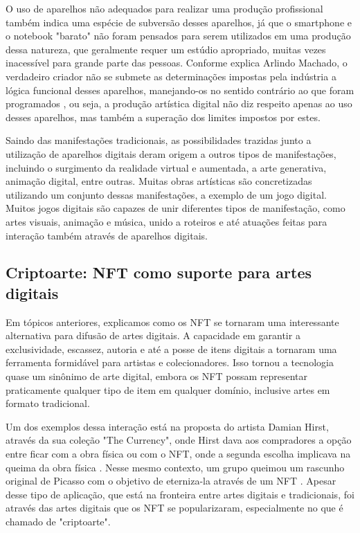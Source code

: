 O uso de aparelhos não adequados para realizar uma produção profissional também indica uma espécie de subversão desses aparelhos, já que o smartphone e o notebook "barato" não foram pensados para serem utilizados em uma produção dessa natureza, que geralmente requer um estúdio apropriado, muitas vezes inacessível para grande parte das pessoas. Conforme explica Arlindo Machado, o verdadeiro criador não se submete as determinações impostas pela indústria a lógica funcional desses aparelhos, manejando-os no sentido contrário ao que foram programados \cite{Machado}, ou seja, a produção artística digital não diz respeito apenas ao uso desses aparelhos, mas também a superação dos limites impostos por estes. 

Saindo das manifestações tradicionais, as possibilidades trazidas junto a utilização de aparelhos digitais deram origem a outros tipos de manifestações, incluindo o surgimento da realidade virtual e aumentada, a arte generativa, animação digital, entre outras. Muitas obras artísticas são concretizadas utilizando um conjunto dessas manifestações, a exemplo de um jogo digital. Muitos jogos digitais são capazes de unir diferentes tipos de manifestação, como artes visuais, animação e música, unido a roteiros e até atuações feitas para interação também através de aparelhos digitais. 

\subsection{Criptoarte: NFT como suporte para artes digitais}
\label{subsec: criptoarte}

Em tópicos anteriores, explicamos como os NFT se tornaram uma interessante alternativa para difusão de artes digitais. A capacidade em garantir a exclusividade, escassez, autoria e até a posse de itens digitais a tornaram uma ferramenta formidável para artistas e colecionadores. Isso tornou a tecnologia quase um sinônimo de arte digital, embora os NFT possam representar praticamente qualquer tipo de item em qualquer domínio, inclusive artes em formato tradicional. 

Um dos exemplos dessa interação está na proposta do artista Damian Hirst, através da sua coleção "The Currency", onde Hirst dava aos compradores a opção entre ficar com a obra física ou com o NFT, onde a segunda escolha implicava na queima da obra física \cite{Holland}. Nesse mesmo contexto, um grupo queimou um rascunho original de Picasso com o objetivo de eterniza-la através de um NFT \cite{Ignacio}. Apesar desse tipo de aplicação, que está na fronteira entre artes digitais e tradicionais, foi através das artes digitais que os NFT se popularizaram, especialmente no que é chamado de "criptoarte". 

